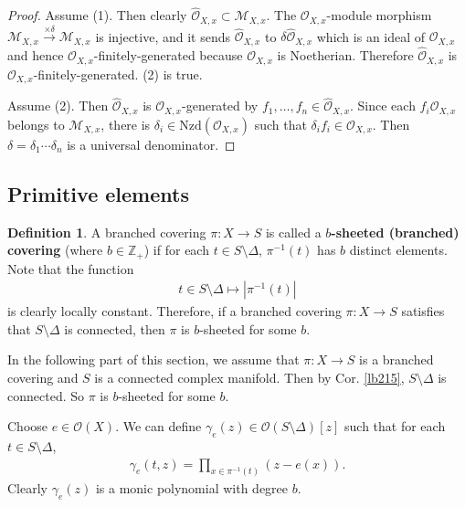 \documentclass[12pt,b5paper,notitlepage]{report}
\theoremstyle{definition}
\newtheorem{df}{Definition}[section]
\theoremstyle{plain}
\newcommand{\scr}{\mathscr}
\newcommand{\Zbb}{\mathbb Z}
\newcommand{\Nzd}{\mathrm{Nzd}}
\newcommand{\Owht}{\widehat{\scr O}}
\numberwithin{equation}{section}
\begin{document}
\begin{proof}
Assume (1). Then clearly $\Owht_{X,x}\subset\scr M_{X,x}$. The $\scr O_{X,x}$-module morphism $\scr M_{X,x}\xrightarrow{\times\delta}\scr M_{X,x}$ is injective, and it sends $\Owht_{X,x}$ to $\delta\Owht_{X,x}$ which is an ideal of $\scr O_{X,x}$ and hence $\scr O_{X,x}$-finitely-generated because $\scr O_{X,x}$ is Noetherian. Therefore $\Owht_{X,x}$ is $\scr O_{X,x}$-finitely-generated. (2) is true.


Assume (2). Then $\Owht_{X,x}$ is $\scr O_{X,x}$-generated by $f_1,\dots,f_n\in\Owht_{X,x}$. Since each $f_i\scr O_{X,x}$ belongs to $\scr M_{X,x}$, there is $\delta_i\in\Nzd(\scr O_{X,x})$ such that $\delta_if_i\in\scr O_{X,x}$. Then $\delta=\delta_1\cdots\delta_n$ is a universal denominator.
\end{proof}


\subsection{Primitive elements}








\begin{df}
A branched covering $\pi:X\rightarrow S$ is called a \textbf{$b$-sheeted (branched) covering}  (where $b\in\Zbb_+$) if for each $t\in S\setminus\Delta$, $\pi^{-1}(t)$ has $b$ distinct elements. Note that the function
\begin{align*}
t\in S\setminus\Delta\mapsto |\pi^{-1}(t)|
\end{align*}
is clearly locally constant. Therefore, if a branched covering $\pi:X\rightarrow S$ satisfies that $S\setminus\Delta$ is connected, then $\pi$ is $b$-sheeted for some $b$.
\end{df}






In the following part of this section, we assume that $\pi:X\rightarrow S$ is a branched covering and $S$ is a connected complex manifold. Then by Cor. \ref{lb215}, $S\setminus\Delta$ is connected. So $\pi$ is $b$-sheeted for some $b$.

Choose $e\in\scr O(X)$. We can define $\gamma_e(z)\in\scr O(S\setminus\Delta)[z]$ such that for each $t\in S\setminus\Delta$,
\begin{align}
\gamma_e(t,z)=\prod_{x\in \pi^{-1}(t)}(z-e(x)).
\end{align}
Clearly $\gamma_e(z)$ is a monic polynomial with degree $b$. 
\end{document}
